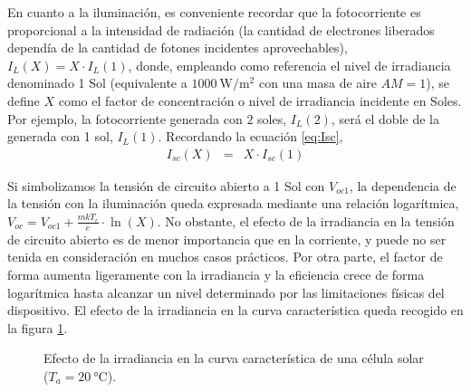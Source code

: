 En cuanto a la iluminación, es conveniente recordar que la fotocorriente
es proporcional a la intensidad de radiación (la cantidad de electrones
liberados dependía de la cantidad de fotones incidentes aprovechables),
$I_{L}(X)=X\cdot I_{L}(1)$, donde, empleando como referencia el nivel
de irradiancia denominado 1 Sol (equivalente a $\SI{1000}{\watt\per\meter\squared}$
con una masa de aire $AM=1$), se define $X$ como el factor de concentración
o nivel de irradiancia incidente en Soles. Por ejemplo, la fotocorriente
generada con $2$ soles, $I_{L}(2)$, será el doble de la generada
con 1 sol, $I_{L}(1)$. Recordando la ecuación \ref{eq:Isc}, \begin{eqnarray}
I_{sc}(X) & = & X\cdot I_{sc}(1)\label{eq:IscRadiacion}\end{eqnarray}


Si simbolizamos la tensión de circuito abierto a 1 Sol con $V_{oc1}$,
la dependencia de la tensión con la iluminación queda expresada mediante
una relación logarítmica, $V_{oc}=V_{oc1}+\frac{mkT_{c}}{e}\cdot\ln(X)$.
No obstante, el efecto de la irradiancia en la tensión de circuito
abierto es de menor importancia que en la corriente, y puede no ser
tenida en consideración en muchos casos prácticos. Por otra parte,
el factor de forma aumenta ligeramente con la irradiancia y la eficiencia
crece de forma logarítmica hasta alcanzar un nivel determinado por
las limitaciones físicas del dispositivo. El efecto de la irradiancia
en la curva característica queda recogido en la figura \ref{fig:EfectoIrradiancia}.


%
\begin{figure}
\begin{centering}
\par\end{centering}

\begin{centering}
\end{centering}

\caption{Efecto de la irradiancia en la curva característica de una célula
solar ($T_a=\SI{20}{\celsius}$).\label{fig:EfectoIrradiancia}}

\end{figure}



